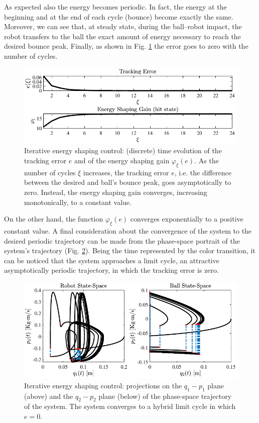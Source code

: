%
As expected also the energy becomes periodic. In fact, the energy at the beginning and at the end of each cycle (bounce) become exactly the same. Moreover, we can see that, at steady state, during the ball--robot impact, the robot transfers to the ball the exact amount of energy necessary to reach the desired bounce peak. Finally, as shown in Fig. \ref{fig:ctrl5} the error goes to zero with the number of cycles.
%
\begin{figure}[!h]
	\centering
	\includegraphics[width=\linewidth]{Figures/ctrl5.pdf}
	\caption{Iterative energy shaping control: (discrete) time evolution of the tracking error $e$ and of the energy shaping gain $\varphi_\xi(e)$. As the number of cycles $\xi$ increases, the tracking error $e$, i.e. the difference between the desired and ball's bounce peak, goes asymptotically to zero. Instead, the energy shaping gain converges, increasing monotonically, to a constant value.}
	\label{fig:ctrl5}
\end{figure}
%
On the other hand, the function $\varphi_\xi(e)$ converges exponentially to a positive constant value. 
%
A final consideration about the convergence of the system to the desired periodic trajectory can be made from the phase-space portrait of the system's trajectory (Fig. \ref{fig:ctrl2}). Being the time represented by the color transition, it can be noticed that the system approaches a limit cycle, an attractive asymptotically periodic trajectory, in which the tracking error is zero.
%
%
\begin{figure}[!h]
	\centering
	\includegraphics[width=\linewidth]{Figures/ctrl2.pdf}
	\caption[Iterative energy shaping control: phase--space trajectories]{Iterative energy shaping control: projections on the $q_1-p_1$ plane (above) and the $q_2-p_2$ plane (below) of the phase-space trajectory of the system. The system converges to a hybrid limit cycle in which $e=0$.}
	\label{fig:ctrl2}
\end{figure}
%
\clearpage
%
